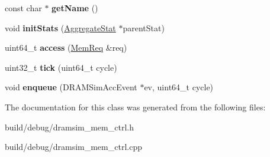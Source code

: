 \begin{DoxyCompactItemize}
\item 
\hypertarget{classDRAMSimMemory_a712837b00ca1ff452c6b314d0eac70ec}{const char $\ast$ {\bfseries get\-Name} ()}\label{classDRAMSimMemory_a712837b00ca1ff452c6b314d0eac70ec}

\item 
\hypertarget{classDRAMSimMemory_a270e07a2c22746179abb8d1e0ae442f6}{void {\bfseries init\-Stats} (\hyperlink{classAggregateStat}{Aggregate\-Stat} $\ast$parent\-Stat)}\label{classDRAMSimMemory_a270e07a2c22746179abb8d1e0ae442f6}

\item 
\hypertarget{classDRAMSimMemory_aec4b3a71bfa1e021e34d6091c31ffb97}{uint64\-\_\-t {\bfseries access} (\hyperlink{structMemReq}{Mem\-Req} \&req)}\label{classDRAMSimMemory_aec4b3a71bfa1e021e34d6091c31ffb97}

\item 
\hypertarget{classDRAMSimMemory_ae3e9517bb81acd6cc17961f210490db5}{uint32\-\_\-t {\bfseries tick} (uint64\-\_\-t cycle)}\label{classDRAMSimMemory_ae3e9517bb81acd6cc17961f210490db5}

\item 
\hypertarget{classDRAMSimMemory_a71ba63111322818f232cd1efc04a5aff}{void {\bfseries enqueue} (D\-R\-A\-M\-Sim\-Acc\-Event $\ast$ev, uint64\-\_\-t cycle)}\label{classDRAMSimMemory_a71ba63111322818f232cd1efc04a5aff}

\end{DoxyCompactItemize}


The documentation for this class was generated from the following files\-:\begin{DoxyCompactItemize}
\item 
build/debug/dramsim\-\_\-mem\-\_\-ctrl.\-h\item 
build/debug/dramsim\-\_\-mem\-\_\-ctrl.\-cpp\end{DoxyCompactItemize}
